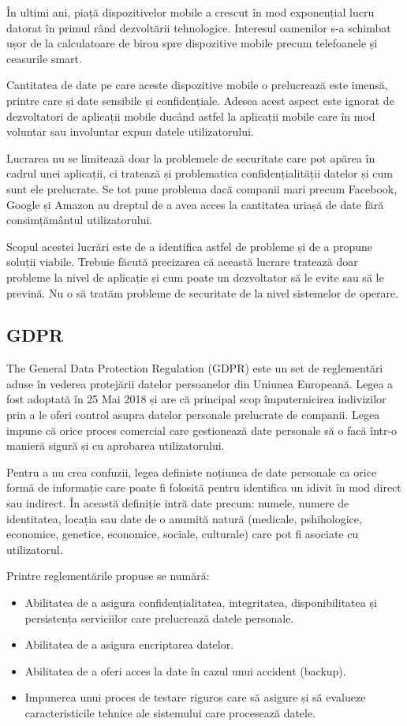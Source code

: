 \documentclass[12pt]{article}
\begin{document}
În ultimi ani, piață dispozitivelor mobile a crescut în mod exponențial lucru datorat în primul
rând dezvoltării tehnologice. Interesul oamenilor s-a schimbat ușor de la calculatoare de birou spre 
dispozitive mobile precum telefoanele și ceasurile smart. 

Cantitatea de date pe care aceste dispozitive mobile o prelucrează este imensă, printre care și date sensibile
și confidențiale. Adesea acest aspect este ignorat de dezvoltatori de aplicații mobile ducând astfel
la aplicații mobile care în mod voluntar sau involuntar expun datele utilizatorului. 

Lucrarea nu se limitează doar la problemele de securitate care pot apărea în cadrul unei aplicații, ci 
tratează și problematica confidențialității datelor și cum sunt ele prelucrate. Se tot pune problema dacă companii mari precum Facebook, Google și Amazon au dreptul de a avea acces la
cantitatea uriașă de date fără consimțământul utilizatorului.

Scopul acestei lucrări este de a identifica astfel de probleme și de a propune soluții viabile.
Trebuie făcută precizarea că această lucrare tratează doar probleme la nivel de aplicație și cum poate
un dezvoltator să le evite sau să le prevină. Nu o să tratăm probleme de securitate de la nivel sistemelor
de operare.

\newpage

\subsection{GDPR}

The General Data Protection Regulation (GDPR) este un set de reglementări aduse în vederea protejării datelor
persoanelor din Uniunea Europeană. Legea a fost adoptată în 25 Mai 2018 și are că principal scop împuternicirea
indivizilor prin a le oferi control asupra datelor personale prelucrate de companii. Legea impune că 
orice proces comercial care gestionează date personale să o facă într-o manieră sigură și cu aprobarea
utilizatorului.

Pentru a nu crea confuzii, legea definiste noțiunea de date personale ca orice formă de informație
care poate fi folosită pentru identifica un idivit în mod direct sau indirect. În această definiție intră
date precum: numele, numere de identitatea, locația sau date de o anumită natură (medicale, pshihologice, 
economice, genetice, economice, sociale, culturale) care pot fi asociate cu utilizatorul.

Printre reglementările propuse se numără:
\begin{itemize}
    \item Abilitatea de a asigura confidențialitatea, integritatea, disponibilitatea și persistența
    serviciilor care prelucrează datele personale.
    \item Abilitatea de a asigura encriptarea datelor.
    \item Abilitatea de a oferi acces la date în cazul unui accident (backup).
    \item Impunerea unui proces de testare riguros care să asigure și să evalueze caracteristicile
    tehnice ale sistemului care procesează datele.
\end{itemize}
\end{document}
